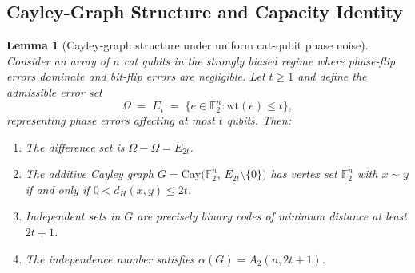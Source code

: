 \documentclass[a4paper,twocolumn,11pt,allowtoday]{quantumarticle}
\theoremstyle{plain}
\newtheorem{lemma}[theorem]{Lemma}
\theoremstyle{definition}
\theoremstyle{remark}
\begin{document}
\subsection{Cayley-Graph Structure and Capacity Identity}
\label{subsec:catqubit_cayley}

\begin{lemma}[Cayley-graph structure under uniform cat-qubit phase noise]
\label{lem:catq_cayley}
Consider an array of $n$ cat qubits in the strongly biased regime
where phase-flip errors dominate and bit-flip errors are negligible.
Let $t\ge 1$ and define the admissible error set
\[
   \Omega \;=\; E_t
     \;=\; \{e\in\mathbb{F}_2^n : \mathrm{wt}(e)\le t\},
\]
representing phase errors affecting at most $t$ qubits. Then:
\begin{enumerate}
\item[\textup{(i)}] The difference set is
  $\Omega-\Omega = E_{2t}$.
\item[\textup{(ii)}] The additive Cayley graph
  $G=\mathrm{Cay}\!\bigl(\mathbb{F}_2^n,\,E_{2t}\setminus\{0\}\bigr)$
  has vertex set $\mathbb{F}_2^n$ with $x\sim y$ if and only if
  $0<d_H(x,y)\le 2t$.
\item[\textup{(iii)}] Independent sets in $G$ are precisely binary
  codes of minimum distance at least $2t+1$.
\item[\textup{(iv)}] The independence number satisfies
  $\alpha(G) = A_2(n,2t+1)$.
\end{enumerate}
\end{lemma}
\end{document}
